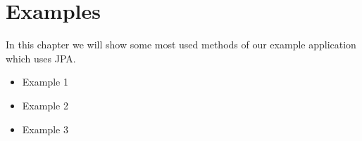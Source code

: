\chapter{Examples}
In this chapter we will show some most used methods of our example application
which uses JPA.

\begin{itemize}
	\item Example 1
		
	\item Example 2
		
	\item Example 3
		
\end{itemize}
